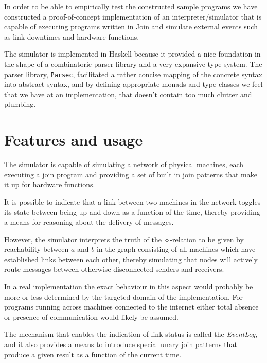

In order to be able to empirically test the constructed sample programs we have
constructed a proof-of-concept implementation of an interpreter/simulator that
is capable of executing programs written in Join and simulate external events
such as link downtimes and hardware functions.

The simulator is implemented in Haskell because it provided a nice foundation in
the shape of a combinatoric parser library and a very expansive type system. The
parser library, \texttt{Parsec}, facilitated a rather concise mapping of the
concrete syntax into abstract syntax, and by defining appropriate monads and
type classes we feel that we have at an implementation, that doesn't contain too
much clutter and plumbing.

\section{Features and usage}
The simulator is capable of simulating a network of physical machines, each
executing a join program and providing a set of built in join patterns that make
it up for hardware functions.

It is possible to indicate that a link between two machines in the network
toggles its state between being up and down as a function of the time, thereby providing a means for reasoning about the delivery of messages.

However, the simulator interprets the truth of the $\diamond$-relation to be
given by reachability between $a$ and $b$ in the graph consisting of all
machines which have established links between each other, thereby simulating
that nodes will actively route messages between otherwise disconnected senders
and receivers.

In a real implementation the exact behaviour in this aspect would probably be
more or less determined by the targeted domain of the implementation. For
programs running across machines connected to the internet either total absence
or presence of communication would likely be assumed.

The mechanism that enables the indication of link status is called the
\emph{EventLog}, and it also provides a means to introduce special unary join
patterns that produce a given result as a function of the current time.

